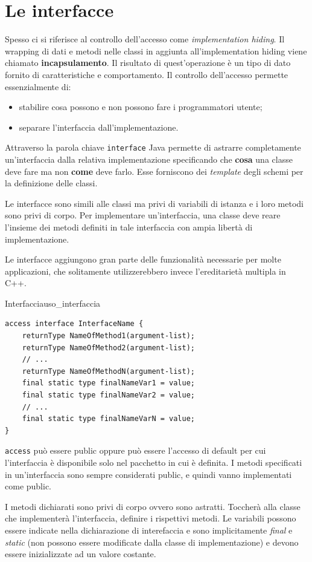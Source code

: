 \documentclass[12pt]{report}
\newcommand{\nmu}{}
\begin{document}
\section{Le interfacce}
Spesso ci si riferisce al controllo dell'accesso come \textit{implementation hiding}. Il wrapping di dati e metodi nelle classi in aggiunta all'implementation hiding viene chiamato \textbf{incapsulamento}. Il risultato di quest'operazione è un tipo di dato fornito di caratteristiche e comportamento. Il controllo dell'accesso permette essenzialmente di:
\begin{itemize}
	\item stabilire cosa possono e non possono fare i programmatori utente;
	\item separare l'interfaccia dall'implementazione.
\end{itemize}
Attraverso la parola chiave \texttt{interface} Java permette di astrarre completamente un'interfaccia dalla relativa implementazione specificando che \textbf{cosa} una classe deve fare ma non \textbf{come} deve farlo. Esse forniscono dei \textit{template} degli schemi per la definizione delle classi.

Le interfacce sono simili alle classi ma privi di variabili di istanza e i loro metodi sono privi di corpo. Per implementare un'interfaccia, una classe deve reare l'insieme dei metodi definiti in tale interfaccia con ampia libertà di implementazione.

Le interfacce aggiungono gran parte delle funzionalità necessarie per molte applicazioni, che solitamente utilizzerebbero invece l'ereditarietà multipla in C++.
\begin{example}{\nmu Interfaccia}{uso_interfaccia}
\begin{lstlisting}[style=javastyle]
access interface InterfaceName {
	returnType NameOfMethod1(argument-list);
	returnType NameOfMethod2(argument-list);
	// ...
	returnType NameOfMethodN(argument-list);
	final static type finalNameVar1 = value;
	final static type finalNameVar2 = value;
	// ...
	final static type finalNameVarN = value;
}
\end{lstlisting}
\end{example}
\texttt{access} può essere public oppure può essere l'accesso di default per cui l'interfaccia è disponibile solo nel pacchetto in cui è definita. I metodi specificati in un'interfaccia sono sempre considerati public, e quindi vanno implementati come public.

I metodi dichiarati sono privi di corpo ovvero sono astratti. Toccherà alla classe che implementerà l'interfaccia, definire i rispettivi metodi. Le variabili possono essere indicate nella dichiarazione di interefaccia e sono implicitamente \textit{final} e \textit{static} (non possono essere modificate dalla classe di implementazione) e devono essere inizializzate ad un valore costante.
\end{document}
